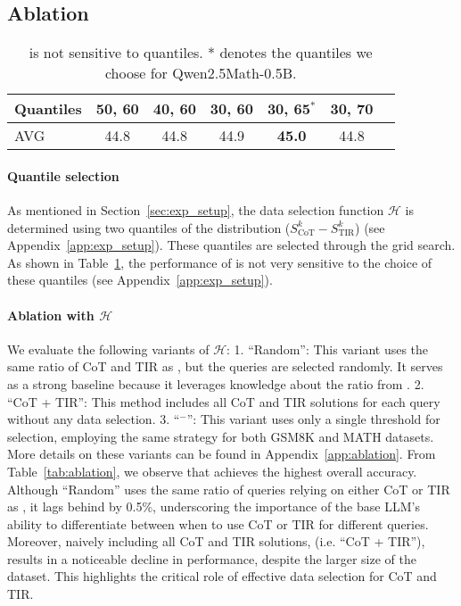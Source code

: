 \subsection{Ablation}\label{sec:ablation}
\begin{table}[htbp!]
  
  \footnotesize
  \centering
    \begin{tabular}{@{}l|cccccc@{}}
\toprule
Quantiles & 50, 60 & 40, 60 & 30, 60 & 30, 65$^*$ & 30, 70 \\
\midrule
AVG & 44.8 & 44.8 & 44.9 & \textbf{45.0} & 44.8 \\
\bottomrule
\end{tabular}
  \caption{{\method} is not sensitive to quantiles. * denotes the quantiles we choose for Qwen2.5Math-0.5B.}
  \label{tab:threshold}
\end{table}
\paragraph{Quantile selection}
As mentioned in Section~\ref{sec:exp_setup}, the data selection function $\mathcal{H}$ is determined using two quantiles of the distribution ($S_{\text{CoT}}^k - S_{\text{TIR}}^k$) (see Appendix~\ref{app:exp_setup}). 
These quantiles are selected through the grid search. 
As shown in Table~\ref{tab:threshold}, the performance of {\method} is not very sensitive to the choice of these quantiles (see Appendix~\ref{app:exp_setup}). 



\paragraph{Ablation with $\mathcal{H}$}
We evaluate the following variants of $\mathcal{H}$:
1. ``Random'': This variant uses the same ratio of CoT and TIR as {\method}, but the queries are selected randomly. It serves as a strong baseline because it leverages knowledge about the ratio from {\method}.
2. ``CoT + TIR'': This method includes all CoT and TIR solutions for each query without any data selection.
3. ``{\method}$^-$'': This variant uses only a single threshold for selection, employing the same strategy for both GSM8K and MATH datasets.
More details on these variants can be found in Appendix~\ref{app:ablation}. 
From Table~\ref{tab:ablation}, we observe that {\method} achieves the highest overall accuracy. 
Although ``Random'' uses the same ratio of queries relying on either CoT or TIR as {\method}, it lags behind by 0.5\%, underscoring the importance of the base LLM's ability to differentiate between when to use CoT or TIR for different queries. 
Moreover, naively including all CoT and TIR solutions, (i.e. ``CoT + TIR''), results in a noticeable decline in performance, despite the larger size of the {\dsft} dataset. 
This highlights the critical role of effective data selection for CoT and TIR.


